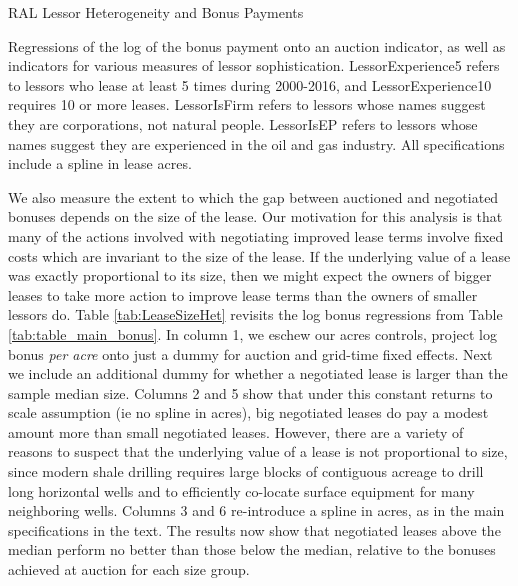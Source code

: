 \documentclass[12pt]{article}
\begin{document}
\begin{appendices}
\addtolength{\tabcolsep}{5pt}
\begin{table}[H]
\begin{center}
\begin{threeparttable}
	\caption{RAL Lessor Heterogeneity and Bonus Payments}
	\label{tab:LessorHet}
 	\small
   	            
    \footnotesize
    \begin{tablenotes}
    	\item Regressions of the log of the bonus payment onto an auction indicator, as well as indicators for various measures of lessor sophistication.  LessorExperience5 refers to lessors who lease at least 5 times during 2000-2016, and LessorExperience10 requires 10 or more leases.  LessorIsFirm refers to lessors whose names suggest they are corporations, not natural people.  LessorIsEP refers to lessors whose names suggest they are experienced in the oil and gas industry.  All specifications include a spline in lease acres. 
    \end{tablenotes}
\end{threeparttable}
\end{center}
\end{table}

We also measure the extent to which the gap between auctioned and negotiated bonuses depends on the size of the lease. Our motivation for this analysis is that many of the actions involved with negotiating improved lease terms involve fixed costs which are invariant to the size of the lease. If the underlying value of a lease was exactly proportional to its size, then we might expect the owners of bigger leases to take more action to improve lease terms than the owners of smaller lessors do. Table \ref{tab:LeaseSizeHet} revisits the log bonus regressions from Table \ref{tab:table_main_bonus}. In column 1, we eschew our acres controls, project log bonus \textit{per acre} onto just a dummy for auction and grid-time fixed effects. Next we include an additional dummy for whether a negotiated lease is larger than the sample median size. Columns 2 and 5 show that under this constant returns to scale assumption (ie no spline in acres), big negotiated leases do pay a modest amount more than small negotiated leases. However, there are a variety of reasons to suspect that the underlying value of a lease is not proportional to size, since modern shale drilling requires large blocks of contiguous acreage to drill long horizontal wells and to efficiently co-locate surface equipment for many neighboring wells. Columns 3 and 6 re-introduce a spline in acres, as in the main specifications in the text. The results now show that negotiated leases above the median perform no better than those below the median, relative to the bonuses achieved at auction for each size group. 


\end{appendices}
\end{document}
